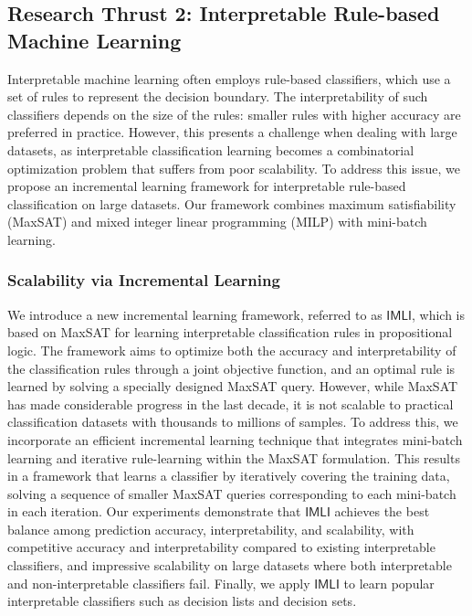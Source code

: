 \documentclass[11pt]{article}
\begin{document}
	

		
	
	\subsection*{Research Thrust 2: Interpretable Rule-based Machine Learning}

	Interpretable machine learning often employs rule-based classifiers, which use a set of rules to represent the decision boundary. The interpretability of such classifiers depends on the size of the rules: smaller rules with higher accuracy are preferred in practice. However, this presents a challenge when dealing with large datasets, as interpretable classification learning becomes a combinatorial optimization problem that suffers from poor scalability. To address this issue, we propose an incremental learning framework for interpretable rule-based classification on large datasets. Our framework combines maximum satisfiability (MaxSAT) and mixed integer linear programming (MILP) with mini-batch learning.
	
	\subsubsection*{Scalability via Incremental Learning}
	We introduce a new incremental learning framework, referred to as $\mathsf{IMLI}$, which is based on MaxSAT for learning interpretable classification rules in propositional logic. The framework aims to optimize both the accuracy and interpretability of the classification rules through a joint objective function, and an optimal rule is learned by solving a specially designed MaxSAT query. However, while MaxSAT has made considerable progress in the last decade, it is not scalable to practical classification datasets with thousands to millions of samples. To address this, we incorporate an efficient incremental learning technique that integrates mini-batch learning and iterative rule-learning within the MaxSAT formulation. This results in a framework that learns a classifier by iteratively covering the training data, solving a sequence of smaller MaxSAT queries corresponding to each mini-batch in each iteration. Our experiments demonstrate that $\mathsf{IMLI}$ achieves the best balance among prediction accuracy, interpretability, and scalability, with competitive accuracy and interpretability compared to existing interpretable classifiers, and impressive scalability on large datasets where both interpretable and non-interpretable classifiers fail. Finally, we apply $\mathsf{IMLI}$ to learn popular interpretable classifiers such as decision lists and decision sets.
	
\end{document}
